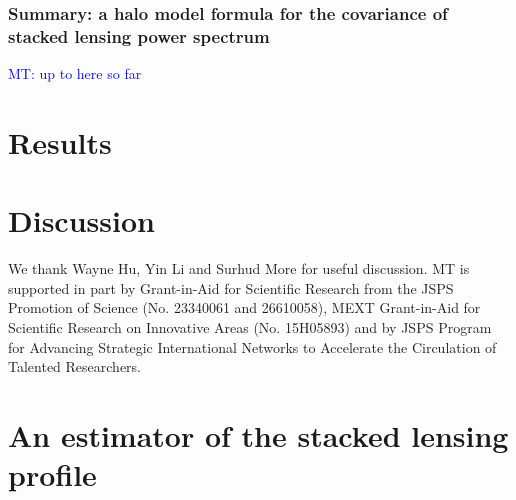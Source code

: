 \documentclass[onecolumn,notitlepage,showpacs,amsmath,amssymb,prd,floatfix]{revtex4-1}
\newcommand{\mtrv}[1]{{\textcolor{blue}{#1}}}
\begin{document}
\subsubsection{Summary: a halo model formula for the covariance of
   stacked lensing power spectrum}

\mtrv{MT: up to here so far}
   
\section{Results}



\section{Discussion}


 We thank Wayne Hu, Yin Li and Surhud
More for useful discussion. MT is supported in part by Grant-in-Aid for
Scientific Research from the JSPS Promotion of Science (No. 23340061 and
26610058), MEXT Grant-in-Aid for Scientific Research on Innovative Areas
(No. 15H05893) and by JSPS Program for Advancing Strategic International
Networks to Accelerate the Circulation of Talented Researchers.





\appendix

\section{An estimator of the stacked lensing profile}
\end{document}
